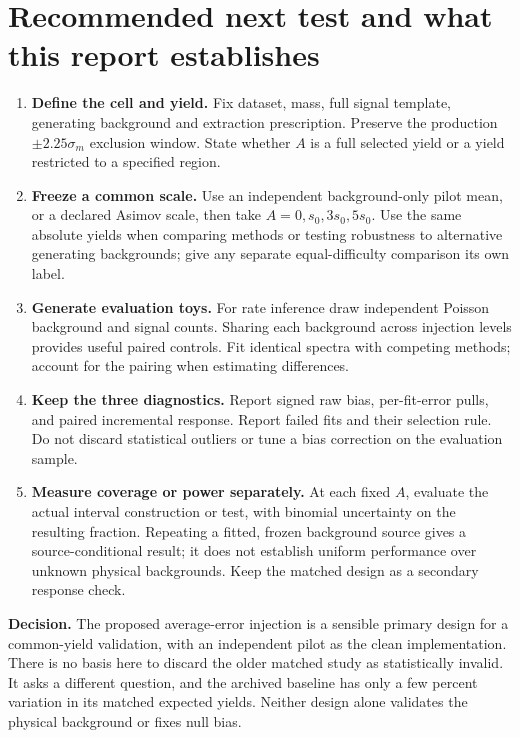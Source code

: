 \documentclass[11pt]{article}
\begin{document}
\section{Recommended next test and what this report establishes}
\begin{enumerate}
 \item \textbf{Define the cell and yield.} Fix dataset, mass, full signal
 template, generating background and extraction prescription. Preserve the
 production $\pm2.25\sigma_m$ exclusion window. State whether $A$ is a
 full selected yield or a yield restricted to a specified region.
 \item \textbf{Freeze a common scale.} Use an independent background-only
 pilot mean, or a declared Asimov scale, then take
 $A=0,s_0,3s_0,5s_0$. Use the same absolute yields when comparing methods
 or testing robustness to alternative generating backgrounds; give any
 separate equal-difficulty comparison its own label.
 \item \textbf{Generate evaluation toys.} For rate inference draw independent
 Poisson background and signal counts. Sharing each background across
 injection levels provides useful paired controls. Fit identical spectra
 with competing methods; account for the pairing when estimating differences.
 \item \textbf{Keep the three diagnostics.} Report signed raw bias,
 per-fit-error pulls, and paired incremental response. Report failed fits
 and their selection rule. Do not discard statistical outliers or tune a
 bias correction on the evaluation sample.
 \item \textbf{Measure coverage or power separately.} At each fixed $A$,
 evaluate the actual interval construction or test, with binomial uncertainty
 on the resulting fraction. Repeating a fitted, frozen background source
 gives a source-conditional result; it does not establish uniform performance
 over unknown physical backgrounds. Keep the matched design as a secondary
 response check.
\end{enumerate}

\textbf{Decision.} The proposed average-error injection is a sensible primary
design for a common-yield validation, with an independent pilot as the clean
implementation. There is no basis here to discard the older matched study
as statistically invalid. It asks a different question, and the archived
baseline has only a few percent variation in its matched expected yields.
Neither design alone validates the physical background or fixes null bias.
\end{document}
